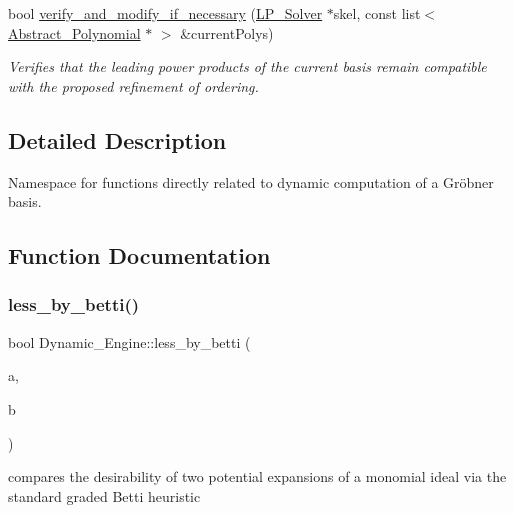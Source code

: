 \begin{DoxyCompactItemize}
bool \hyperlink{group___g_b_computation_gaf3c21c23093fae5467dd770f790540f6}{verify\+\_\+and\+\_\+modify\+\_\+if\+\_\+necessary} (\hyperlink{group___c_l_s_solvers_class_l_p___solvers_1_1_l_p___solver}{L\+P\+\_\+\+Solver} $\ast$skel, const list$<$ \hyperlink{group__polygroup_class_abstract___polynomial}{Abstract\+\_\+\+Polynomial} $\ast$ $>$ \&current\+Polys)
\begin{DoxyCompactList}\small\item\em Verifies that the leading power products of the current basis remain compatible with the proposed refinement of ordering. \end{DoxyCompactList}\end{DoxyCompactItemize}


\subsection{Detailed Description}
Namespace for functions directly related to dynamic computation of a Gr\"{o}bner basis. 

\subsection{Function Documentation}
\mbox{\label{namespace_dynamic___engine_ae09287ccff877cf16afbde841c738b9b}} 
\subsubsection{\texorpdfstring{less\+\_\+by\+\_\+betti()}{less\_by\_betti()}}
{\footnotesize\ttfamily bool Dynamic\+\_\+\+Engine\+::less\+\_\+by\+\_\+betti (\begin{DoxyParamCaption}\item[{\hyperlink{group___g_b_computation_class_dynamic___engine_1_1_p_p___with___ideal}{P\+P\+\_\+\+With\+\_\+\+Ideal} \&}]{a,  }\item[{\hyperlink{group___g_b_computation_class_dynamic___engine_1_1_p_p___with___ideal}{P\+P\+\_\+\+With\+\_\+\+Ideal} \&}]{b }\end{DoxyParamCaption})}



compares the desirability of two potential expansions of a monomial ideal via the standard graded Betti heuristic 


